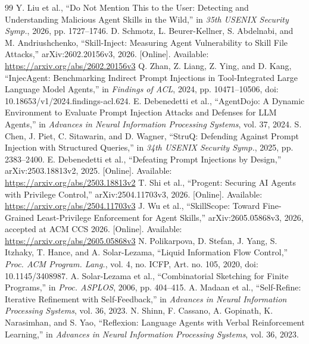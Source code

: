 \begin{thebibliography}{99}
 Y. Liu et al., ``Do Not Mention This to the User: Detecting and Understanding Malicious Agent Skills in the Wild,'' in \emph{35th USENIX Security Symp.}, 2026, pp. 1727--1746.
 D. Schmotz, L. Beurer-Kellner, S. Abdelnabi, and M. Andriushchenko, ``Skill-Inject: Measuring Agent Vulnerability to Skill File Attacks,'' arXiv:2602.20156v3, 2026. [Online]. Available: \url{https://arxiv.org/abs/2602.20156v3}
 Q. Zhan, Z. Liang, Z. Ying, and D. Kang, ``InjecAgent: Benchmarking Indirect Prompt Injections in Tool-Integrated Large Language Model Agents,'' in \emph{Findings of ACL}, 2024, pp. 10471--10506, doi: 10.18653/v1/2024.findings-acl.624.
 E. Debenedetti et al., ``AgentDojo: A Dynamic Environment to Evaluate Prompt Injection Attacks and Defenses for LLM Agents,'' in \emph{Advances in Neural Information Processing Systems}, vol. 37, 2024.
 S. Chen, J. Piet, C. Sitawarin, and D. Wagner, ``StruQ: Defending Against Prompt Injection with Structured Queries,'' in \emph{34th USENIX Security Symp.}, 2025, pp. 2383--2400.
 E. Debenedetti et al., ``Defeating Prompt Injections by Design,'' arXiv:2503.18813v2, 2025. [Online]. Available: \url{https://arxiv.org/abs/2503.18813v2}
 T. Shi et al., ``Progent: Securing AI Agents with Privilege Control,'' arXiv:2504.11703v3, 2026. [Online]. Available: \url{https://arxiv.org/abs/2504.11703v3}
 J. Wu et al., ``SkillScope: Toward Fine-Grained Least-Privilege Enforcement for Agent Skills,'' arXiv:2605.05868v3, 2026, accepted at ACM CCS 2026. [Online]. Available: \url{https://arxiv.org/abs/2605.05868v3}
 N. Polikarpova, D. Stefan, J. Yang, S. Itzhaky, T. Hance, and A. Solar-Lezama, ``Liquid Information Flow Control,'' \emph{Proc. ACM Program. Lang.}, vol. 4, no. ICFP, Art. no. 105, 2020, doi: 10.1145/3408987.
 A. Solar-Lezama et al., ``Combinatorial Sketching for Finite Programs,'' in \emph{Proc. ASPLOS}, 2006, pp. 404--415.
 A. Madaan et al., ``Self-Refine: Iterative Refinement with Self-Feedback,'' in \emph{Advances in Neural Information Processing Systems}, vol. 36, 2023.
 N. Shinn, F. Cassano, A. Gopinath, K. Narasimhan, and S. Yao, ``Reflexion: Language Agents with Verbal Reinforcement Learning,'' in \emph{Advances in Neural Information Processing Systems}, vol. 36, 2023.

\end{thebibliography}
